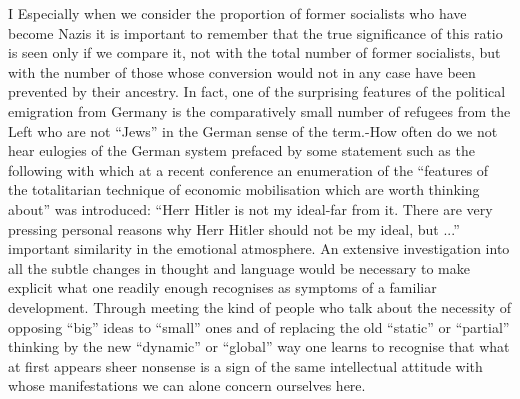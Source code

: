 \documentclass[11pt,openany]{book}
\begin{document}
I Especially when we consider the proportion of former socialists who have become Nazis it is important to remember that the true significance of this ratio is seen only if we compare it, not with the total number of former socialists, but with the number of those whose conversion would not in any case have been prevented by their ancestry. In fact, one of the surprising features of the political emigration from Germany is the comparatively small number of refugees from the Left who are not ``Jews'' in the German sense of the term.-How often do we not hear eulogies of the German system prefaced by some statement such as the following with which at a recent conference an enumeration of the ``features of the totalitarian technique of economic mobilisation which are worth thinking about'' was introduced: ``Herr Hitler is not my ideal-far from it. There are very pressing personal reasons why Herr Hitler should not be my ideal, but ...'' important similarity in the emotional atmosphere. An extensive investigation into all the subtle changes in thought and language would be necessary to make explicit what one readily enough recognises as symptoms of a familiar development. Through meeting the kind of people who talk about the necessity of opposing ``big'' ideas to ``small'' ones and of replacing the old ``static'' or ``partial'' thinking by the new ``dynamic'' or ``global'' way one learns to recognise that what at first appears sheer nonsense is a sign of the same intellectual attitude with whose manifestations we can alone concern ourselves here.

\begin{center}\textasteriskcentered\hspace{0.9em}\textasteriskcentered\hspace{0.9em}\textasteriskcentered\end{center}

\begin{center}\textasteriskcentered\hspace{0.9em}\textasteriskcentered\hspace{0.9em}\textasteriskcentered\end{center}

\begin{center}\textasteriskcentered\hspace{0.9em}\textasteriskcentered\hspace{0.9em}\textasteriskcentered\end{center}

\begin{center}\textasteriskcentered\hspace{0.9em}\textasteriskcentered\hspace{0.9em}\textasteriskcentered\end{center}
\end{document}
